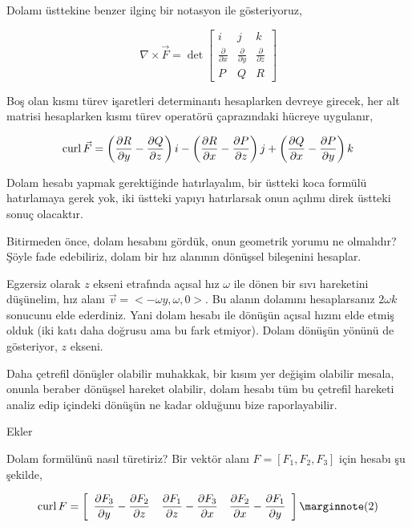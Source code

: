 \documentclass[12pt,fleqn]{article}\usepackage{../../common}
\begin{document}
Dolamı üsttekine benzer ilginç bir notasyon ile gösteriyoruz,

$$
\nabla \times \vec{F} =
\det
\left[\begin{array}{ccc}
i & j & k \\
\frac{\partial }{\partial x} & \frac{\partial }{\partial y} & \frac{\partial }{\partial z} \\
P & Q & R
\end{array}\right]
$$

Boş olan kısmı türev işaretleri determinantı hesaplarken devreye girecek, her
alt matrisi hesaplarken kısmı türev operatörü çaprazındaki hücreye uygulanır,

$$
\operatorname{curl} \vec{F} =
  \left(\frac{\partial R}{\partial y} - \frac{\partial Q}{\partial z}\right) i -
  \left(\frac{\partial R}{\partial x} - \frac{\partial P}{\partial z}\right) j +
  \left(\frac{\partial Q}{\partial x} - \frac{\partial P}{\partial y}\right) k   
$$

Dolam hesabı yapmak gerektiğinde hatırlayalım, bir üstteki koca formülü
hatırlamaya gerek yok, iki üstteki yapıyı hatırlarsak onun açılımı direk
üstteki sonuç olacaktır.

Bitirmeden önce, dolam hesabını gördük, onun geometrik yorumu ne olmalıdır?
Şöyle fade edebiliriz, dolam bir hız alanının dönüşsel bileşenini hesaplar.

Egzersiz olarak $z$ ekseni etrafında açısal hız $\omega$ ile dönen bir sıvı
hareketini düşünelim, hız alanı $\vec{v} = < -\omega y, \omega, 0 >$.  Bu
alanın dolamını hesaplarsanız $2 \omega k$ sonucunu elde ederdiniz.  Yani dolam
hesabı ile dönüşün açısal hızını elde etmiş olduk (iki katı daha doğrusu ama bu
fark etmiyor). Dolam dönüşün yönünü de gösteriyor, $z$ ekseni.

Daha çetrefil dönüşler olabilir muhakkak, bir kısım yer değişim olabilir mesala,
onunla beraber dönüşsel hareket olabilir, dolam hesabı tüm bu çetrefil hareketi
analiz edip içindeki dönüşün ne kadar olduğunu bize raporlayabilir.

Ekler

Dolam formülünü nasıl türetiriz? Bir vektör alanı $F = [F_1,F_2,F_3]$ için
hesabı şu şekilde,

$$
\curl F = \left[\begin{array}{ccc} 
\dfrac{\partial F_3}{\partial y} - \dfrac{\partial F_2}{\partial z} & 
\dfrac{\partial F_1}{\partial z} - \dfrac{\partial F_3}{\partial x} & 
\dfrac{\partial F_2}{\partial x} - \dfrac{\partial F_1}{\partial y} 
\end{array}\right]
\mlabel{2}
$$
\end{document}
